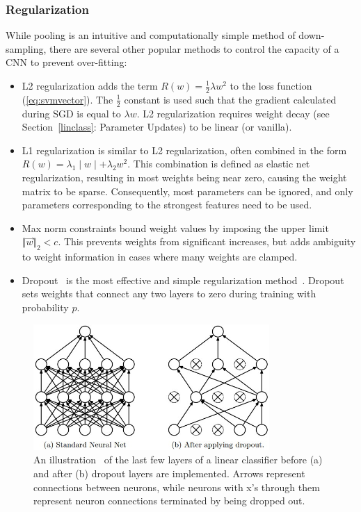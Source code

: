 \subsubsection{Regularization}
While pooling is an intuitive and computationally simple method of down-sampling, there are several other popular methods to control the capacity of a CNN to prevent over-fitting:
\begin{itemize}
\item L2 regularization adds the term $R(w)=\frac{1}{2}\lambda w^2$ to the loss function (\ref{eq:svmvector}). The $\frac{1}{2}$ constant is used such that the gradient calculated during SGD is equal to $\lambda w$. L2 regularization requires weight decay (see Section~\ref{linclass}: Parameter Updates) to be linear (or vanilla).
\item L1 regularization is similar to L2 regularization, often combined in the form $R(w) = \lambda_1 \mid w \mid + \lambda_2 w^2$. This combination is defined as elastic net regularization, resulting in most weights being near zero, causing the weight matrix to be sparse. Consequently, most parameters can be ignored, and only parameters corresponding to the strongest features need to be used.
\item Max norm constraints bound weight values by imposing the upper limit $\Vert \vec{w} \Vert_2 < c$. This prevents weights from significant increases, but adds ambiguity to weight information in cases where many weights are clamped.
\item Dropout~\cite{dropout} is the most effective and simple regularization method~\cite{cs231}. Dropout sets weights that connect any two layers to zero during training with probability $p$.
\end{itemize}

\begin{figure}[ht!]
	\centering	\includegraphics[width=0.8\textwidth,keepaspectratio]{figs/dropout.jpeg}
    \caption{An illustration~\cite{cs231} of the last few layers of a linear classifier before (a) and after (b) dropout layers are implemented. Arrows represent connections between neurons, while neurons with x's through them represent neuron connections terminated by being dropped out.}
\label{fig:drop}      
\end{figure}

